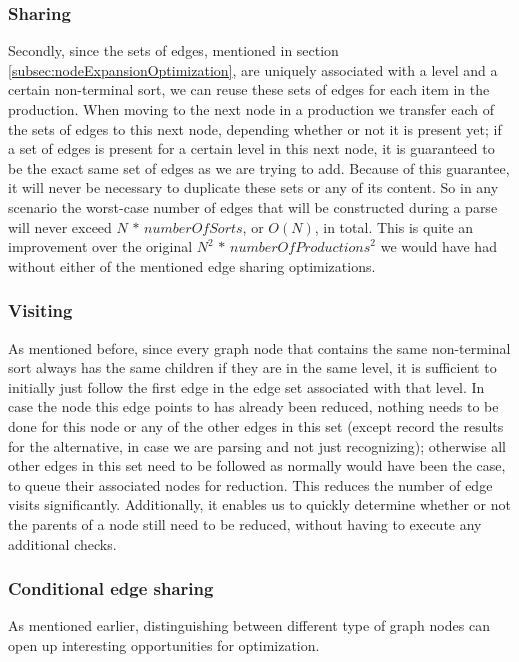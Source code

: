 \documentclass[a4paper,10pt]{article}
\begin{document}
\subsubsection{Sharing}
Secondly, since the sets of edges, mentioned in section \ref{subsec:nodeExpansionOptimization}, are uniquely associated with a level and a certain non-terminal sort, we can reuse these sets of edges for each item in the production. When moving to the next node in a production we transfer each of the sets of edges to this next node, depending whether or not it is present yet; if a set of edges is present for a certain level in this next node, it is guaranteed to be the exact same set of edges as we are trying to add. Because of this guarantee, it will never be necessary to duplicate these sets or any of its content. So in any scenario the worst-case number of edges that will be constructed during a parse will never exceed $N\,*\,\mathit{numberOfSorts}$, or $O(N)$, in total. This is quite an improvement over the original ${N}^2\,*\,\mathit{numberOfProductions}^2$ we would have had without either of the mentioned edge sharing optimizations.

\subsubsection{Visiting}
\label{subsec:edgeVisitOptimization}
As mentioned before, since every graph node that contains the same non-terminal sort always has the same children if they are in the same level, it is sufficient to initially just follow the first edge in the edge set associated with that level. In case the node this edge points to has already been reduced, nothing needs to be done for this node or any of the other edges in this set (except record the results for the alternative, in case we are parsing and not just recognizing); otherwise all other edges in this set need to be followed as normally would have been the case, to queue their associated nodes for reduction. This reduces the number of edge visits significantly. Additionally, it enables us to quickly determine whether or not the parents of a node still need to be reduced, without having to execute any additional checks.

\subsubsection{Conditional edge sharing}
As mentioned earlier, distinguishing between different type of graph nodes can open up interesting opportunities for optimization.
\end{document}
